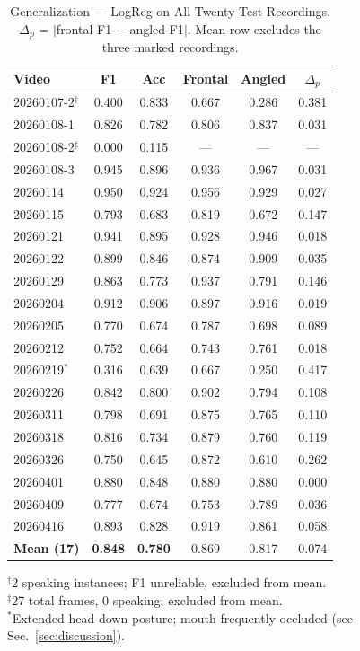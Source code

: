 \documentclass[conference]{IEEEtran}
\begin{document}
\begin{table}[t]
\caption{Generalization — LogReg on All Twenty Test Recordings.
         $\Delta_p$ = $|$frontal F1 $-$ angled F1$|$.
         Mean row excludes the three marked recordings.}
\label{tab:generalization}
\centering
\footnotesize
\setlength{\tabcolsep}{3pt}
\begin{tabular}{lccccc}
\toprule
\textbf{Video} & \textbf{F1} & \textbf{Acc} &
\textbf{Frontal} & \textbf{Angled} & \textbf{$\Delta_p$} \\
\midrule
20260107-2$^\dagger$ & 0.400 & 0.833 & 0.667 & 0.286 & 0.381 \\
20260108-1 & 0.826 & 0.782 & 0.806 & 0.837 & 0.031 \\
20260108-2$^\ddagger$ & 0.000 & 0.115 & --- & --- & --- \\
20260108-3 & 0.945 & 0.896 & 0.936 & 0.967 & 0.031 \\
20260114   & 0.950 & 0.924 & 0.956 & 0.929 & 0.027 \\
20260115   & 0.793 & 0.683 & 0.819 & 0.672 & 0.147 \\
20260121   & 0.941 & 0.895 & 0.928 & 0.946 & 0.018 \\
20260122   & 0.899 & 0.846 & 0.874 & 0.909 & 0.035 \\
20260129   & 0.863 & 0.773 & 0.937 & 0.791 & 0.146 \\
20260204   & 0.912 & 0.906 & 0.897 & 0.916 & 0.019 \\
20260205   & 0.770 & 0.674 & 0.787 & 0.698 & 0.089 \\
20260212   & 0.752 & 0.664 & 0.743 & 0.761 & 0.018 \\
20260219$^*$  & 0.316 & 0.639 & 0.667 & 0.250 & 0.417 \\
20260226   & 0.842 & 0.800 & 0.902 & 0.794 & 0.108 \\
20260311   & 0.798 & 0.691 & 0.875 & 0.765 & 0.110 \\
20260318   & 0.816 & 0.734 & 0.879 & 0.760 & 0.119 \\
20260326   & 0.750 & 0.645 & 0.872 & 0.610 & 0.262 \\
20260401   & 0.880 & 0.848 & 0.880 & 0.880 & 0.000 \\
20260409   & 0.777 & 0.674 & 0.753 & 0.789 & 0.036 \\
20260416   & 0.893 & 0.828 & 0.919 & 0.861 & 0.058 \\
\midrule
\textbf{Mean (17)} & \textbf{0.848} & \textbf{0.780} & 0.869 & 0.817 & 0.074 \\
\bottomrule
\end{tabular}
\vspace{2pt}

{\footnotesize
$^\dagger$2 speaking instances; F1 unreliable, excluded from mean.\\
$^\ddagger$27 total frames, 0 speaking; excluded from mean.\\
$^*$Extended head-down posture; mouth frequently occluded (see Sec.~\ref{sec:discussion}).}
\end{table}
\end{document}
